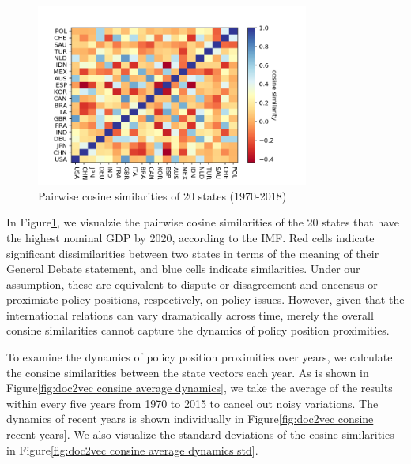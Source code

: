 \documentclass[final,authoryear,3p,12pt,times,hidelinks]{elsarticle}
\begin{document}
\begin{figure}[ht!]
  \begin{center}
    \includegraphics[width=0.8\textwidth]{graphs/doc2vec_consine_similarity_overall.png}
    \caption{Pairwise cosine similarities of 20 states (1970-2018)}
    \label{fig:doc2vec consine overall}
  \end{center}
\end{figure}

In Figure\ref{fig:doc2vec consine overall}, we visualzie the pairwise cosine similarities of the 20 states that have the highest nominal GDP by 2020, according to the IMF. Red cells indicate significant dissimilarities between two states in terms of the meaning of their General Debate statement, and blue cells indicate similarities. Under our assumption, these are equivalent to dispute or disagreement and oncensus or proximiate policy positions, respectively, on policy issues. However, given that the international relations can vary dramatically across time, merely the overall consine similarities cannot capture the dynamics of policy position proximities. 

To examine the dynamics of policy position proximities over years, we calculate the consine similarities between the state vectors each year. As is shown in Figure\ref{fig:doc2vec consine average dynamics}, we take the average of the results within every five years from 1970 to 2015 to cancel out noisy variations. The dynamics of recent years is shown individually in Figure\ref{fig:doc2vec consine recent years}. We also visualize the standard deviations of the cosine similarities in Figure\ref{fig:doc2vec consine average dynamics std}. 
\end{document}
